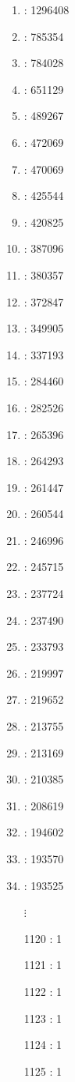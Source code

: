 \begin{tiny}
\begin{multicols}{4}
\begin{enumerate}
    \item {} : 1296408
    \item {} : 785354
    \item {} : 784028
    \item {} : 651129
    \item {} : 489267
    \item {} : 472069
    \item {} : 470069
    \item {} : 425544
    \item {} : 420825
    \item {} : 387096
    \item {} : 380357
    \item {} : 372847
    \item {} : 349905
    \item {} : 337193
    \item {} : 284460
    \item {} : 282526
    \item {} : 265396
    \item {} : 264293
    \item {} : 261447
    \item {} : 260544
    \item {} : 246996
    \item {} : 245715
    \item {} : 237724
    \item {} : 237490
    \item {} : 233793
    \item {} : 219997
    \item {} : 219652
    \item {} : 213755
    \item {} : 213169
    \item {} : 210385
    \item {} : 208619
    \item {} : 194602
    \item {} : 193570
    \item {} : 193525
	\item[] $\vdots$
	\item[1120]  : 1
	\item[1121]  : 1
	\item[1122]  : 1
	\item[1123]  : 1
	\item[1124]  : 1
	\item[1125]  : 1
\end{enumerate}
\end{multicols}
\end{tiny}



